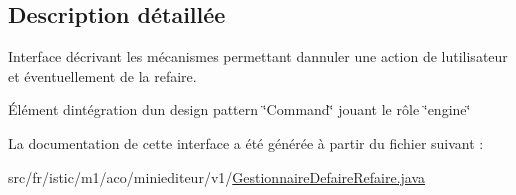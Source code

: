 \subsection{Description détaillée}
Interface décrivant les mécanismes permettant d\textquotesingle{}annuler une action de l\textquotesingle{}utilisateur et éventuellement de la refaire. 

Élément d\textquotesingle{}intégration d\textquotesingle{}un design pattern \char`\"{}\+Command\char`\"{} jouant le rôle \char`\"{}engine\char`\"{} 

La documentation de cette interface a été générée à partir du fichier suivant \+:\begin{DoxyCompactItemize}
\item 
src/fr/istic/m1/aco/miniediteur/v1/\hyperlink{GestionnaireDefaireRefaire_8java}{Gestionnaire\+Defaire\+Refaire.\+java}\end{DoxyCompactItemize}
